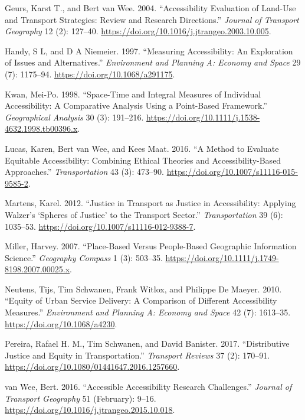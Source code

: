 \documentclass[msc,numbers]{coppe}
\begin{document}
  \hypertarget{refs}{}
  \begin{CSLReferences}{1}{0}
  \leavevmode\hypertarget{ref-geurs2004accessibility}{}%
  Geurs, Karst T., and Bert van Wee. 2004. {``Accessibility Evaluation of Land-Use and Transport Strategies: Review and Research Directions.''} \emph{Journal of Transport Geography} 12 (2): 127--40. \url{https://doi.org/10.1016/j.jtrangeo.2003.10.005}.

  \leavevmode\hypertarget{ref-handy1997measuring}{}%
  Handy, S L, and D A Niemeier. 1997. {``Measuring {Accessibility}: {An Exploration} of {Issues} and {Alternatives}.''} \emph{Environment and Planning A: Economy and Space} 29 (7): 1175--94. \url{https://doi.org/10.1068/a291175}.

  \leavevmode\hypertarget{ref-kwan1998spacetime}{}%
  Kwan, Mei-Po. 1998. {``Space-{Time} and {Integral Measures} of {Individual Accessibility}: {A Comparative Analysis Using} a {Point}-Based {Framework}.''} \emph{Geographical Analysis} 30 (3): 191--216. \url{https://doi.org/10.1111/j.1538-4632.1998.tb00396.x}.

  \leavevmode\hypertarget{ref-lucas2016method}{}%
  Lucas, Karen, Bert van Wee, and Kees Maat. 2016. {``A Method to Evaluate Equitable Accessibility: Combining Ethical Theories and Accessibility-Based Approaches.''} \emph{Transportation} 43 (3): 473--90. \url{https://doi.org/10.1007/s11116-015-9585-2}.

  \leavevmode\hypertarget{ref-martens2012justice}{}%
  Martens, Karel. 2012. {``Justice in Transport as Justice in Accessibility: Applying {Walzer}'s {`{Spheres} of {Justice}'} to the Transport Sector.''} \emph{Transportation} 39 (6): 1035--53. \url{https://doi.org/10.1007/s11116-012-9388-7}.

  \leavevmode\hypertarget{ref-miller2007placebased}{}%
  Miller, Harvey. 2007. {``Place-{Based} Versus {People}-{Based Geographic Information Science}.''} \emph{Geography Compass} 1 (3): 503--35. \url{https://doi.org/10.1111/j.1749-8198.2007.00025.x}.

  \leavevmode\hypertarget{ref-neutens2010equity}{}%
  Neutens, Tijs, Tim Schwanen, Frank Witlox, and Philippe De Maeyer. 2010. {``Equity of {Urban Service Delivery}: {A Comparison} of {Different Accessibility Measures}.''} \emph{Environment and Planning A: Economy and Space} 42 (7): 1613--35. \url{https://doi.org/10.1068/a4230}.

  \leavevmode\hypertarget{ref-pereira2017distributive}{}%
  Pereira, Rafael H. M., Tim Schwanen, and David Banister. 2017. {``Distributive Justice and Equity in Transportation.''} \emph{Transport Reviews} 37 (2): 170--91. \url{https://doi.org/10.1080/01441647.2016.1257660}.

  \leavevmode\hypertarget{ref-vanwee2016accessible}{}%
  van Wee, Bert. 2016. {``Accessible Accessibility Research Challenges.''} \emph{Journal of Transport Geography} 51 (February): 9--16. \url{https://doi.org/10.1016/j.jtrangeo.2015.10.018}.

  \end{CSLReferences}
\end{document}
